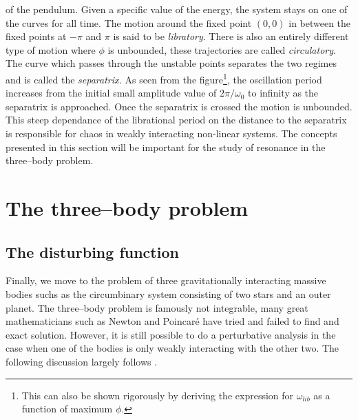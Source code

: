 of the pendulum. Given a specific value of the energy, the system stays 
on one of the curves for all time. The motion around the fixed point $(0,0)$
 in between the fixed points at $-\pi$ and $\pi$ is said to be \emph{libratory}.
There is also an entirely different type of motion where $\phi$ is unbounded,
these trajectories are called \emph{circulatory}. The curve which passes through
the unstable points separates the two regimes and is called the \emph{separatrix.} 
As seen from the figure\footnote{This can also be shown rigorously by deriving the
expression for $\omega_{lib}$ as a function of maximum $\phi$.},
the oscillation period increases from the initial
small amplitude value of $2\pi/\omega_0$ to infinity as the separatrix is
approached. Once the separatrix is crossed the motion is unbounded. This
steep dependance of the librational period on the distance to the separatrix is
responsible for chaos in weakly interacting non-linear systems. The concepts
presented in this section will be important for the study of resonance in the
three--body problem.

\section{The three--body problem}
\label{sec:three_body}
\subsection{The disturbing function}
Finally, we move to the problem of three gravitationally interacting massive 
bodies suchs as the circumbinary system consisting of two stars and 
an outer planet. The three--body problem is famously not integrable, many 
great mathematicians such as Newton and Poincaré have tried and failed to find and
exact solution. However, it is still possible to do a perturbative analysis
in the case when one of the bodies is only weakly interacting with the
other two. The following discussion largely follows \citet{Mardling2013}.

